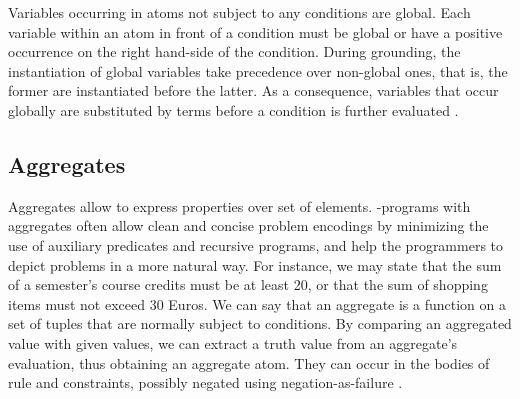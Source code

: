 \documentclass[14pt,a4paper, titlepage]{article}
\begin{document}
Variables occurring in atoms not subject to any conditions are global. Each variable within an atom in front of a condition must be global or have a positive occurrence on the right hand-side of the condition. During grounding, the instantiation of global variables take precedence over non-global ones, that is, the former are instantiated before the latter. As a consequence, variables that occur globally are substituted by terms before a condition is further evaluated \cite{pott}.    

\subsection{Aggregates}
Aggregates allow to express properties over set of elements. \hex{}-programs with aggregates often allow clean and concise problem encodings by minimizing the use of auxiliary predicates and recursive programs, and help the programmers to depict problems in a more natural way. For instance, we may state that the sum of a semester's course credits must be at least 20, or that the sum of shopping items must not exceed 30 Euros. We can say that an aggregate is a function on a set of tuples that are normally subject to conditions. By comparing an aggregated value with given values, we can extract a truth value from an aggregate's evaluation, thus obtaining an aggregate atom. They can occur in the bodies of rule and constraints, possibly negated using negation-as-failure \cite{pott}.
\end{document}
